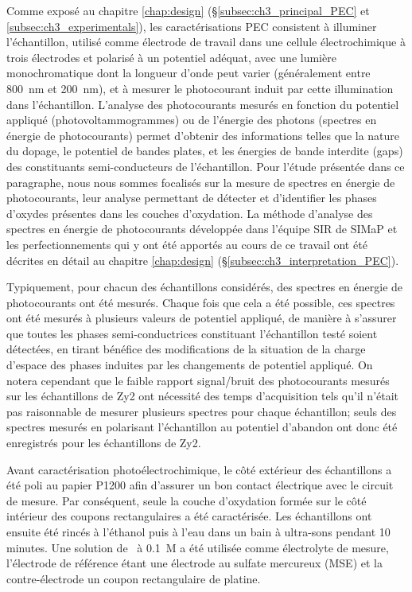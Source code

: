 \begin{refsection}
    Comme exposé au chapitre \ref{chap:design} (\S \ref{subsec:ch3_principal_PEC} et \ref{subsec:ch3_experimentals}),
    les caractérisations
    PEC consistent à illuminer l’échantillon, utilisé comme
    électrode de travail dans une cellule électrochimique à trois électrodes et
    polarisé à un potentiel adéquat, avec une lumière monochromatique dont la longueur
    d’onde peut varier (généralement entre \SI{800}{\nano\meter} et \SI{200}{\nano\meter}), et à mesurer le
    photocourant induit par cette illumination dans l’échantillon. L’analyse des 
    photocourants mesurés en fonction du potentiel appliqué (photovoltammogrammes) 
    ou de l’énergie des photons (spectres en énergie de photocourants) permet d’obtenir
    des informations telles que la nature du dopage, le potentiel de bandes plates, et les
    énergies de bande interdite (gaps) des constituants semi-conducteurs de l’échantillon.
    Pour l’étude présentée dans ce paragraphe, nous nous sommes focalisés sur la mesure de
    spectres en énergie de photocourants, leur analyse permettant de détecter et d’identifier
    les phases d’oxydes présentes dans les couches d’oxydation. La méthode d’analyse des 
    spectres en énergie de photocourants développée dans l’équipe SIR de SIMaP et les
    perfectionnements qui y ont été apportés au cours de ce travail ont été décrites en
    détail au chapitre \ref{chap:design} (\S \ref{subsec:ch3_interpretation_PEC}).

    Typiquement, pour chacun des échantillons considérés, des spectres en 
    énergie de photocourants ont été mesurés. Chaque fois que cela a été possible,
    ces spectres ont été mesurés à plusieurs valeurs de potentiel appliqué, de manière
    à s’assurer que toutes les phases semi-conductrices constituant l’échantillon testé
    soient détectées, en tirant bénéfice des modifications de la situation de la charge
    d’espace des phases induites par les changements de potentiel appliqué. On notera
    cependant que le faible rapport signal/bruit des photocourants mesurés sur les
    échantillons de Zy2 ont nécessité des temps d’acquisition tels qu’il n’était pas
    raisonnable de mesurer plusieurs spectres pour chaque échantillon; seuls des spectres
    mesurés en polarisant l’échantillon au potentiel d’abandon ont donc été
    enregistrés pour les échantillons de Zy2.

    Avant caractérisation photoélectrochimique, le côté extérieur des échantillons
    a été poli au papier P1200 afin d’assurer un bon contact électrique avec le 
    circuit de mesure. Par conséquent, seule la couche d’oxydation formée sur le
    côté intérieur des coupons rectangulaires a été caractérisée. Les échantillons
    ont ensuite été rincés à l’éthanol puis à l’eau dans un bain à ultra-sons pendant
    10 minutes. Une solution de \NaSO\ à 0.1~M a été utilisée comme électrolyte de
    mesure, l’électrode de référence étant une électrode au sulfate mercureux (MSE)
    et la contre-électrode un coupon rectangulaire de platine.


\end{refsection}
